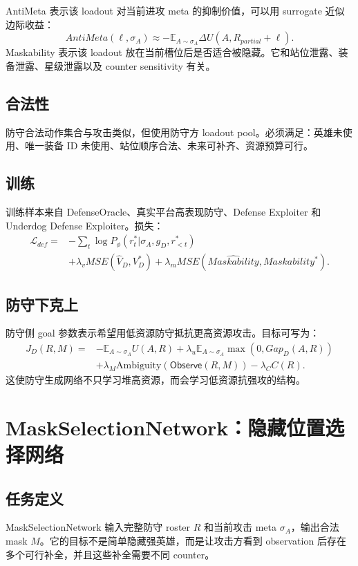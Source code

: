 \documentclass[UTF8,12pt,openany]{ctexbook}
\newcommand{\Observe}{\mathsf{Observe}}
\newcommand{\E}{\mathbb{E}}
\begin{document}
AntiMeta 表示该 loadout 对当前进攻 meta 的抑制价值，可以用 surrogate 近似边际收益：
\begin{equation}
AntiMeta(\ell,\sigma_A)\approx -\E_{A\sim\sigma_A}\Delta U(A,R_{partial}+\ell).
\end{equation}
Maskability 表示该 loadout 放在当前槽位后是否适合被隐藏。它和站位泄露、装备泄露、星级泄露以及 counter sensitivity 有关。

\section{合法性}
防守合法动作集合与攻击类似，但使用防守方 loadout pool。必须满足：英雄未使用、唯一装备 ID 未使用、站位顺序合法、未来可补齐、资源预算可行。

\section{训练}
训练样本来自 DefenseOracle、真实平台高表现防守、Defense Exploiter 和 Underdog Defense Exploiter。损失：
\begin{equation}
\begin{aligned}
\mathcal{L}_{def}={}&-\sum_t\log P_\phi(r_t^*|\sigma_A,g_D,r_{<t}^*)\\
&+\lambda_vMSE(\hat V_D,V_D^*)+\lambda_mMSE(\widehat{Maskability},Maskability^*).
\end{aligned}
\end{equation}

\section{防守下克上}
防守侧 goal 参数表示希望用低资源防守抵抗更高资源攻击。目标可写为：
\begin{equation}
\begin{aligned}
J_D(R,M)=&-\E_{A\sim\sigma_A}U(A,R)
+\lambda_u\E_{A\sim\sigma_A}\max(0,Gap_D(A,R))\\
&+\lambda_M \mathrm{Ambiguity}(\Observe(R,M))-\lambda_C C(R).
\end{aligned}
\end{equation}
这使防守生成网络不只学习堆高资源，而会学习低资源抗强攻的结构。


\chapter{MaskSelectionNetwork：隐藏位置选择网络}

\section{任务定义}
MaskSelectionNetwork 输入完整防守 roster $R$ 和当前攻击 meta $\sigma_A$，输出合法 mask $M$。它的目标不是简单隐藏强英雄，而是让攻击方看到 observation 后存在多个可行补全，并且这些补全需要不同 counter。
\end{document}
